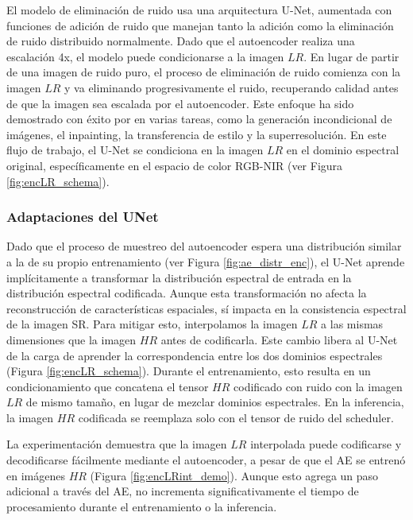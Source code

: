 El modelo de eliminación de ruido usa una arquitectura U-Net, aumentada con funciones de adición de ruido que manejan tanto la adición como la eliminación de ruido distribuido normalmente. Dado que el autoencoder realiza una escalación 4x, el modelo puede condicionarse a la imagen $LR$. En lugar de partir de una imagen de ruido puro, el proceso de eliminación de ruido comienza con la imagen $LR$ y va eliminando progresivamente el ruido, recuperando calidad antes de que la imagen sea escalada por el autoencoder. Este enfoque ha sido demostrado con éxito por \autocite{rombach2022highresolution} en varias tareas, como la generación incondicional de imágenes, el inpainting, la transferencia de estilo y la superresolución. En este flujo de trabajo, el U-Net se condiciona en la imagen $LR$ en el dominio espectral original, específicamente en el espacio de color RGB-NIR (ver Figura \ref{fig:encLR_schema}).

\subsubsection{Adaptaciones del UNet}
Dado que el proceso de muestreo del autoencoder espera una distribución similar a la de su propio entrenamiento (ver Figura \ref{fig:ae_distr_enc}), el U-Net aprende implícitamente a transformar la distribución espectral de entrada en la distribución espectral codificada. Aunque esta transformación no afecta la reconstrucción de características espaciales, sí impacta en la consistencia espectral de la imagen SR. Para mitigar esto, interpolamos la imagen $LR$ a las mismas dimensiones que la imagen $HR$ antes de codificarla. Este cambio libera al U-Net de la carga de aprender la correspondencia entre los dos dominios espectrales (Figura \ref{fig:encLR_schema}). Durante el entrenamiento, esto resulta en un condicionamiento que concatena el tensor $HR$ codificado con ruido con la imagen $LR$ de mismo tamaño, en lugar de mezclar dominios espectrales. En la inferencia, la imagen $HR$ codificada se reemplaza solo con el tensor de ruido del scheduler.

La experimentación demuestra que la imagen $LR$ interpolada puede codificarse y decodificarse fácilmente mediante el autoencoder, a pesar de que el AE se entrenó en imágenes $HR$ (Figura \ref{fig:encLRint_demo}). Aunque esto agrega un paso adicional a través del AE, no incrementa significativamente el tiempo de procesamiento durante el entrenamiento o la inferencia.

